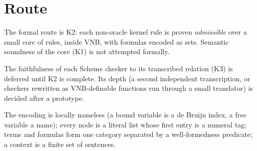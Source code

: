 \section*{Route}
\begin{description}[style=nextline,leftmargin=1.4cm]
\item[DS-8]\label{ds:8} The formal route is K2: each non-oracle kernel rule is proven \emph{admissible} over a small core of rules, inside VNB, with formulas encoded as sets. Semantic soundness of the core (K1) is not attempted formally.
\item[DS-9]\label{ds:9} The faithfulness of each Scheme checker to its transcribed relation (K3) is deferred until K2 is complete. Its depth (a second independent transcription, or checkers rewritten as VNB-definable functions run through a small translator) is decided after a prototype.
\item[DS-10]\label{ds:10} The encoding is locally nameless (a bound variable is a de Bruijn index, a free variable a name); every node is a literal list whose first entry is a numeral tag; terms and formulas form one category separated by a well-formedness predicate; a context is a finite set of sentences.
\end{description}
